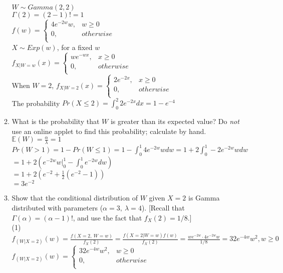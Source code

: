 \documentclass[11pt]{article}
\begin{document}
\begin{enumerate}[label=\textbf{Question \arabic*:},start=1]
\begin{enumerate}
$W \sim Gamma(2, 2)$ \\
$\Gamma(2) = (2-1)! = 1$ \\
$f(w) = \begin{cases}
		4 e^{-2w} w, & w \geq 0 \\ 
		0, & otherwise\\
		\end{cases}$\\
		
$X \sim Exp(w)$, for a fixed $w$ \\
$f_{X | W = w}(x) = \begin{cases}
		w e^{-wx}, & x \geq 0 \\ 
		0, & otherwise\\
		\end{cases}$\\


When $W = 2$, $f_{X | W = 2}(x) = \begin{cases}
		2 e^{-2x}, & x \geq 0 \\ 
		0, & otherwise\\
		\end{cases}$\\
		
The probability $Pr(X \leq 2) = \int_{0}^{2} 2 e^{-2x} dx = 1 - e^{-4}$\\


\item What is the probability that $W$ is greater than its expected value? Do {\em not} use an online applet to find this probability; calculate by hand.\\

$\mathbb{E}(W) = \frac{\alpha}{\lambda} = 1$ \\
$Pr(W > 1) = 1 - Pr(W \leq 1) = 1 - \int_{0}^{1} 4 e^{-2w} w dw = 1 + 2 \int_{0}^{1} -2 e^{-2w} w dw$ \\
$ = 1 + 2 ( e^{-2w} w |_{0}^{1} - \int_{0}^{1} e^{-2w}dw ) $\\
$ = 1 + 2 ( e^{-2} + \frac{1}{2} (e^{-2} - 1))$ \\
$ = 3 e^{-2} $\\ 


\item Show that the conditional distribution of $W$ given $X=2$ is Gamma distributed with parameters ($\alpha=3,\ \lambda=4$). [Recall that $\Gamma(\alpha) = (\alpha-1)!$, and use the fact that $f_X(2) = 1/8$.]\\

(1) $f_{(W | X = 2)}(w) = \frac{f(X=2,\ W=w)}{f_X(2)} = \frac{f(X=2|W=w) f(w)}{f_X(2)} =  \frac{w e^{-2w} \cdot 4 e^{-2w} w}{1/8} = 32 e^{-4w} w^2 , w \geq 0$\\
$f_{(W | X = 2)}(w) =\begin{cases}
		32 e^{-4w} w^2, & w \geq 0 \\ 
		0, & otherwise\\
		\end{cases}$\\



\end{enumerate}
\end{enumerate}
\end{document}
